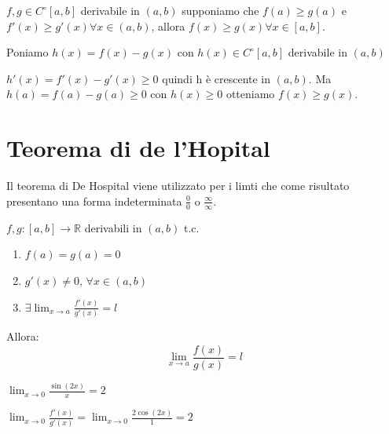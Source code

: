 \begin{proposition}
    $f,g\in C^\circ[a,b]$ derivabile in $(a,b)$ supponiamo che $f(a)\geq g(a)$ e $f'(x)\geq g'(x)\forall x\in(a,b)$, allora $f(x)\geq g(x)\forall x\in[a,b]$.
    \begin{dimostration}
        Poniamo $h(x)=f(x)-g(x)$ con $h(x)\in C^\circ[a,b]$ derivabile in $(a,b)$
        
        $h'(x)=f'(x)-g'(x)\geq0$ quindi h è crescente in $(a,b)$. Ma $h(a)=f(a)-g(a)\geq0$ con $h(x)\geq0$ otteniamo $f(x)\geq g(x)$.
    \end{dimostration}
\end{proposition}

\section{Teorema di de l'Hopital}
Il teorema di De Hospital viene utilizzato per i limti che come risultato presentano una forma indeterminata $\frac{0}{0}$ o $\frac{\infty}{\infty}$.

$f,g:[a,b]\to\mathbb{R}$ derivabili in $(a,b)$ t.c.
\begin{enumerate}
    \item $f(a)=g(a)=0$
    \item $g'(x)\neq0$, $\forall x\in (a,b)$
    \item $\exists\lim_{x\to a}\frac{f'(x)}{g'(x)}=l$
\end{enumerate}

Allora:
\begin{equation}
    \lim_{x\to a}\frac{f(x)}{g(x)}=l
\end{equation}

\begin{example}
    $\lim_{x\to0}\frac{\sin (2x)}{x}=2$
    
    $\lim_{x\to0}\frac{f'(x)}{g'(x)}=\lim_{x\to0}\frac{2\cos(2x)}{1}=2$
\end{example}